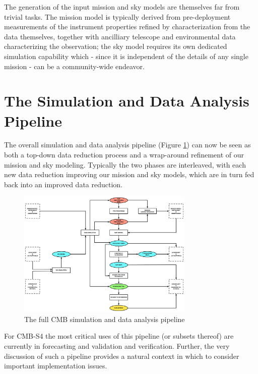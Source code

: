 The generation of the input mission and sky models are themselves far from trivial tasks. The mission model is typically derived from pre-deployment measurements of the instrument properties refined by characterization from the data themselves, together with ancilliary telescope and environmental data characterizing the observation; the sky model requires its own dedicated simulation capability which - since it is independent of the details of any single mission - can be a community-wide endeavor.

\newpage



\newpage



\newpage

\section{The Simulation and Data Analysis Pipeline}

The overall simulation and data analysis pipeline (Figure \ref{fig_simda}) can now be seen as both a top-down data reduction process and a wrap-around refinement of our mission and sky modeling. Typically the two phases are interleaved, with each new data reduction improving our mission and sky models, which are in turn fed back into an improved data reduction.

\begin{figure}[htbp]
\centering
\includegraphics[width=0.75\textwidth]{Analysis/simda}
\caption{The full CMB simulation and data analysis pipeline}
\label{fig_simda}
\end{figure}

For CMB-S4 the most critical uses of this pipeline (or subsets thereof) are currently in forecasting and validation and verification. Further, the very discussion of such a pipeline provides a natural context in which to consider important implementation issues.


